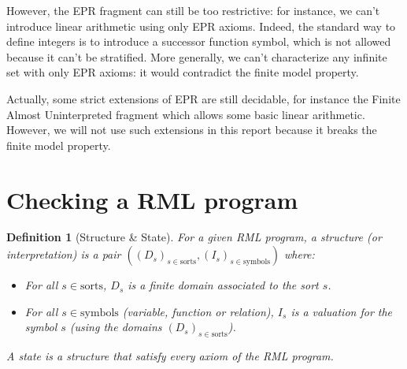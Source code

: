 \documentclass[11pt,a4paper,oldfontcommands,openany]{memoir}
\newtheorem*{definition}{Definition}
\begin{document}
        However, the EPR fragment can still be too restrictive: for instance, we can't introduce linear arithmetic using only EPR axioms.
        Indeed, the standard way to define integers is to introduce a successor function symbol, which is not allowed because it can't be stratified.
        More generally, we can't characterize any infinite set with only EPR axioms: it would contradict the finite model property.

        Actually, some strict extensions of EPR are still decidable, for instance the Finite Almost Uninterpreted fragment\cite{Taube:2018:MDD:3192366.3192414} which allows
        some basic linear arithmetic. However, we will not use such extensions in this report because it breaks the finite model property.


    
    \section{Checking a RML program}

    \begin{definition}[Structure \& State]
        For a given RML program, a structure (or interpretation) is a pair \(((D_s)_{s\in \text{sorts}}, (I_s)_{s\in \text{symbols}})\) where:
        \begin{itemize}
            \item For all \(s \in \text{sorts}\), \(D_s\) is a finite domain associated to the sort \(s\).
            \item For all \(s \in \text{symbols}\) (variable, function or relation), \(I_s\) is a valuation for the symbol \(s\) (using the domains \((D_s)_{s\in \text{sorts}}\)).
        \end{itemize}
        A state is a structure that satisfy every axiom of the RML program.
    \end{definition}
\end{document}
